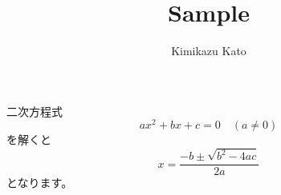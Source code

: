 \documentclass{article}
\title{Sample}
\author{Kimikazu Kato}
\begin{document}
\maketitle
二次方程式
\[ ax^2 + bx + c=0 \quad (a\neq 0)\]
を解くと
\[ x = \frac{-b \pm \sqrt{b^2 - 4ac}}{2a} \]
となります。
\end{document}
